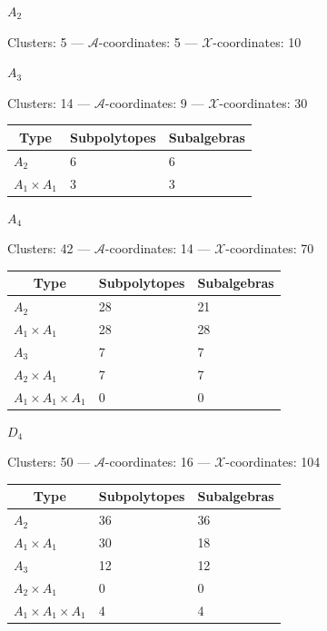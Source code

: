 \documentclass[11pt]{article}
\def\xcoords{$\mathcal{X}$-coordinates}
\def\acoords{$\mathcal{A}$-coordinates}
\begin{document}
\begin{center}
{\qquad \qquad \Large{\(A_2\)} \hfill} 

\qquad Clusters: 5 \quad --- \quad  \acoords: 5 \quad --- \quad \xcoords: 10 \hfill

\vspace{.5cm}

{ \qquad \qquad \Large{\(A_3\)} \hfill} 

\vspace{.2cm}
\qquad Clusters: 14 \quad --- \quad \acoords: 9 \quad --- \quad \xcoords: 30 \hfill \\[1em]

\begin{tabular}{ | l | l | l |}
\multicolumn{1}{c}{Type} &  \multicolumn{1}{c}{Subpolytopes}  &  \multicolumn{1}{c}{Subalgebras} \\
\hline \(A_2\) & 6 & 6 \\ 
\hline \(A_1 \times A_1\) & 3 & 3 \\ 
\hline
\end{tabular} 
\vspace{.5cm}

{ \qquad \qquad \Large{\(A_4\)} \hfill}

\vspace{.2cm}
\qquad Clusters: 42 \quad --- \quad \acoords: 14 \quad --- \quad \xcoords: 70 \hfill \\[1em]

\begin{tabular}{ | l | l | l |}
\multicolumn{1}{c}{Type} &  \multicolumn{1}{c}{Subpolytopes}  &  \multicolumn{1}{c}{Subalgebras} \\
\hline \(A_2\) & 28 & 21 \\ 
\hline \(A_1 \times A_1\) & 28 & 28 \\ \hline 
\hline \(A_3\) & 7 & 7 \\ 
\hline \(A_2 \times A_1\) & 7 & 7 \\ 
\hline \(A_1 \times A_1 \times A_1\) & 0 & 0 \\ 
\hline
\end{tabular}
\vspace{.5cm}

{ \qquad \qquad \Large{\(D_4\)} \hfill} 

\vspace{.2cm}
\qquad Clusters: 50 \quad --- \quad \acoords: 16 \quad --- \quad \xcoords: 104 \hfill \\[1em]

\begin{tabular}{ | l | l | l |}
\multicolumn{1}{c}{Type} &  \multicolumn{1}{c}{Subpolytopes}  &  \multicolumn{1}{c}{Subalgebras} \\
\hline \(A_2\) & 36 & 36 \\ 
\hline \(A_1 \times A_1\) & 30 & 18 \\ \hline 
\hline \(A_3\) & 12 & 12 \\ 
\hline \(A_2 \times A_1\) & 0 & 0 \\ 
\hline \(A_1 \times A_1 \times A_1\) & 4 & 4 \\ 
\hline
\end{tabular}
\vspace{.5cm}


\end{center}
\end{document}
